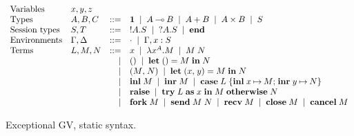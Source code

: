 \begin{figure*}
  \begin{mdframed}\begin{highlight}
    \centering
    \(
    \begin{array}{llrl}
      \text{Variables}
      &\tm{x}, \tm{y}, \tm{z}
      \\
      \text{Types}
      &\ty{A}, \ty{B}, \ty{C}
      &::=& \gvTyUnit
            \sep \gvTyFun{A}{B}
            \sep \gvTySum{A}{B}
            \sep \gvTyPair{A}{B}
            \sep \ty{S}
      \\
      \text{Session types}
      &\ty{S}, \ty{T}
      &::=& \gvTySend{A}{S}
            \sep \gvTyRecv{A}{S}
            \sep \gvTyEnd
      \\
      \text{Environments}
      &\ty{\Gamma}, \ty{\Delta}
      &::= & \emptyenv
             \sep \ty{\Gamma}, \gvVar{x} : \ty{S}
      \\
      \text{Terms}
      &\tm{L}, \tm{M}, \tm{N}
      &::=& \gvVar{x}
            \sep \gvAbs[A]{x}{M}
            \sep \gvApp{M}{N}
      \\
      &
      &\mid& \gvUnit
             \sep \gvLetUnit{M}{N}
      \\
      &
      &\mid& \gvPair{M}{N}
             \sep \gvLetPair{x}{y}{M}{N}
      \\
      &
      &\mid& \gvInl{M}
             \sep \gvInr{M}
             \sep \gvCaseSum{L}{x}{M}{y}{N}
      \\
      &
      &\mid& \gvRaise
             \sep \gvTry{L}{x}{M}{N}
      \\
      &
      &\mid&\gvFork{M}
             \sep \gvSend{M}{N}
             \sep \gvRecv{M}
             \sep \gvClose{M}
             \sep \gvCancel{M}
    \end{array}
    \)
  \end{highlight}\end{mdframed}
  \caption{Exceptional GV, static syntax.}
  \label{fig:egv-static-syntax}
\end{figure*}

